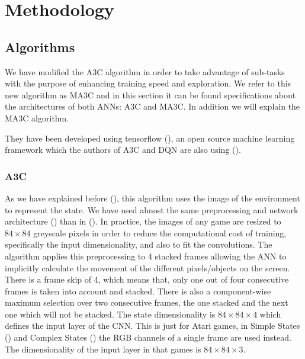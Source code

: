 \chapter{Methodology}

\section{Algorithms}

We have modified the \ac{A3C} algorithm in order to take advantage of sub-tasks with the purpose of enhancing training speed
and exploration.
We refer to this new algorithm as \acf{MA3C} and in this section it can be found specifications about the architectures of
both \acp{ANN}: \ac{A3C} and \ac{MA3C}.
In addition we will explain the \ac{MA3C} algorithm.

They have been developed using tensorflow (\cite{tensorflow2015}), an open source machine learning framework which the authors
of \ac{A3C} and \ac{DQN} are also using (\cite{deepmind_tensorflow}).

\subsection{\acl{A3C}\label{subsec:AlgorithmA3C}}

As we have explained before (), this algorithm uses the image of the environment to represent the state.
We have used almost the same preprocessing and network architecture () than in  (\cite{mnih2016A3C}).
In practice, the images of any game are resized to $84 \times 84$ greyscale pixels in order to reduce the computational cost of training,
specifically the input dimensionality, and also to fit the convolutions.
The algorithm applies this preprocessing to 4 stacked frames allowing the \ac{ANN} to implicitly calculate the movement
of the different pixels/objects on the screen.
There is a frame skip of 4, which means that, only one out of four consecutive frames is taken into account and stacked.
There is also a component-wise maximum selection over two consecutive frames, the one stacked and the next one which will
not be stacked.
The state dimensionality is $84 \times 84 \times 4$ which defines the input layer of the \ac{CNN}.
This is just for Atari games, in Simple States () and Complex States ()
the RGB channels of a single frame are used instead.
The dimensionality of the input layer in that games is $84 \times 84 \times 3$.

